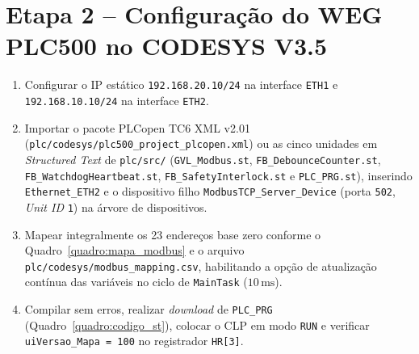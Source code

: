 \section{Etapa 2 -- Configuração do WEG PLC500 no CODESYS V3.5}
\begin{enumerate}
  \item Configurar o IP estático \texttt{192.168.20.10/24} na interface \texttt{ETH1} e \texttt{192.168.10.10/24} na interface \texttt{ETH2}.
  \item Importar o pacote PLCopen TC6 XML v2.01 (\texttt{plc/\allowbreak codesys/\allowbreak plc500\_\allowbreak project\_\allowbreak plcopen.xml}) ou as cinco unidades em \textit{Structured Text} de \texttt{plc/src/} (\texttt{GVL\_\allowbreak Modbus.st}, \texttt{FB\_\allowbreak Debounce\allowbreak Counter.st}, \texttt{FB\_\allowbreak Watchdog\allowbreak Heartbeat.st}, \texttt{FB\_\allowbreak Safety\allowbreak Interlock.st} e \texttt{PLC\_\allowbreak PRG.st}), inserindo \texttt{Ethernet\_\allowbreak ETH2} e o dispositivo filho \texttt{ModbusTCP\_\allowbreak Server\_\allowbreak Device} (porta \texttt{502}, \textit{Unit ID} \texttt{1}) na árvore de dispositivos.
  \item Mapear integralmente os 23 endereços base zero conforme o Quadro~\ref{quadro:mapa_modbus} e o arquivo \texttt{plc/\allowbreak codesys/\allowbreak modbus\_\allowbreak mapping.csv}, habilitando a opção de atualização contínua das variáveis no ciclo de \texttt{MainTask} ($10\,\text{ms}$).
  \item Compilar sem erros, realizar \textit{download} de \texttt{PLC\_PRG} (Quadro~\ref{quadro:codigo_st}), colocar o CLP em modo \texttt{RUN} e verificar \texttt{uiVersao\_Mapa = 100} no registrador \texttt{HR[3]}.
\end{enumerate}


